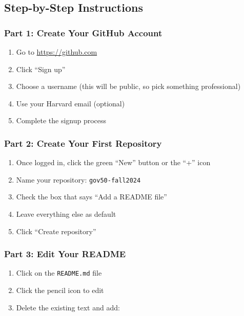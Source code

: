 \documentclass[
  11pt,
  letterpaper]{article}
\providecommand{\tightlist}{%
  \setlength{\itemsep}{0pt}\setlength{\parskip}{0pt}}
\begin{document}
\subsection{Step-by-Step Instructions}\label{step-by-step-instructions}

\subsubsection{Part 1: Create Your GitHub
Account}\label{part-1-create-your-github-account}

\begin{enumerate}
\def\labelenumi{\arabic{enumi}.}
\tightlist
\item
  Go to \url{https://github.com}
\item
  Click ``Sign up''
\item
  Choose a username (this will be public, so pick something
  professional)
\item
  Use your Harvard email (optional)
\item
  Complete the signup process
\end{enumerate}

\subsubsection{Part 2: Create Your First
Repository}\label{part-2-create-your-first-repository}

\begin{enumerate}
\def\labelenumi{\arabic{enumi}.}
\tightlist
\item
  Once logged in, click the green ``New'' button or the ``+'' icon
\item
  Name your repository: \texttt{gov50-fall2024}
\item
  Check the box that says ``Add a README file''
\item
  Leave everything else as default
\item
  Click ``Create repository''
\end{enumerate}

\subsubsection{Part 3: Edit Your README}\label{part-3-edit-your-readme}

\begin{enumerate}
\def\labelenumi{\arabic{enumi}.}
\tightlist
\item
  Click on the \texttt{README.md} file
\item
  Click the pencil icon to edit
\item
  Delete the existing text and add:
\end{enumerate}
\end{document}
